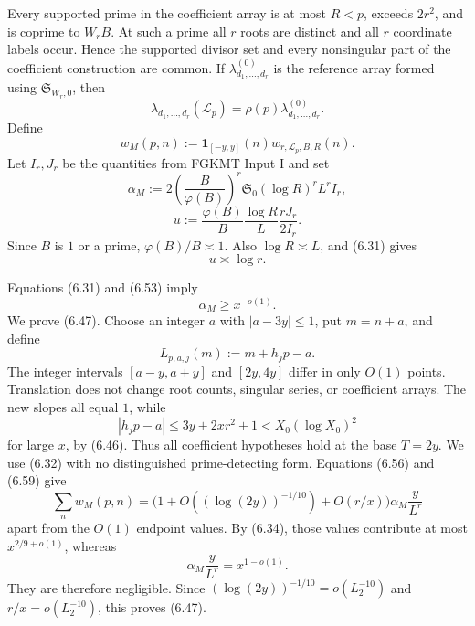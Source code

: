 \documentclass[10pt,letterpaper]{article}
\newcommand{\LL}{\mathcal{L}}
\newcommand{\sing}{\mathfrak{S}}
\newcommand{\ind}{\mathbf{1}}
\begin{document}
Every supported prime in the coefficient array is at most $R<p$, exceeds $2r^2$, and is coprime to $W_rB$. At
such a prime all $r$ roots are distinct and all $r$ coordinate labels occur. Hence the supported divisor set and
every nonsingular part of the coefficient construction are common. If $\lambda_{d_1,\ldots,d_r}^{(0)}$ is the reference array formed
using $\sing_{W_r,0}$, then
\begin{equation}
\lambda_{d_1,\ldots,d_r}(\LL_p)=\rho(p)\lambda_{d_1,\ldots,d_r}^{(0)}.
\tag{6.57}
\end{equation}
Define
\begin{equation}
w_M(p,n):=\ind_{[-y,y]}(n)w_{r,\LL_p,B,R}(n).
\tag{6.58}
\end{equation}
Let $I_r,J_r$ be the quantities from FGKMT Input I and set
\begin{equation}
\alpha_M:=2\left(\frac{B}{\varphi(B)}\right)^r\sing_0(\log R)^rL^rI_r,
\tag{6.59}
\end{equation}
\begin{equation}
u:=\frac{\varphi(B)}B\frac{\log R}L\frac{rJ_r}{2I_r}.
\tag{6.60}
\end{equation}
Since $B$ is $1$ or a prime, $\varphi(B)/B\asymp1$. Also $\log R\asymp L$, and (6.31) gives
\begin{equation}
u\asymp\log r.
\tag{6.61}
\end{equation}

Equations (6.31) and (6.53) imply
\begin{equation}
\alpha_M\ge x^{-o(1)}.
\tag{6.62}
\end{equation}
We prove (6.47). Choose an integer $a$ with $|a-3y|\le1$, put $m=n+a$, and define
\begin{equation}
L_{p,a,j}(m):=m+h_jp-a.
\tag{6.63}
\end{equation}
The integer intervals $[a-y,a+y]$ and $[2y,4y]$ differ in only $O(1)$ points. Translation does not change root
counts, singular series, or coefficient arrays. The new slopes all equal $1$, while
\begin{equation}
|h_jp-a|\le3y+2xr^2+1<X_0(\log X_0)^2
\tag{6.64}
\end{equation}
for large $x$, by (6.46). Thus all coefficient hypotheses hold at the base $T=2y$. We use (6.32) with no
distinguished prime-detecting form. Equations (6.56) and (6.59) give
\begin{equation}
\sum_n w_M(p,n)=\bigl(1+O((\log(2y))^{-1/10})+O(r/x)\bigr)\alpha_M\frac y{L^r}
\tag{6.65}
\end{equation}
apart from the $O(1)$ endpoint values. By (6.34), those values contribute at most $x^{2/9+o(1)}$, whereas
\[
\alpha_M\frac y{L^r}=x^{1-o(1)}.
\]
They are therefore negligible. Since $(\log(2y))^{-1/10}=o(L_2^{-10})$ and $r/x=o(L_2^{-10})$, this proves (6.47).
\end{document}
